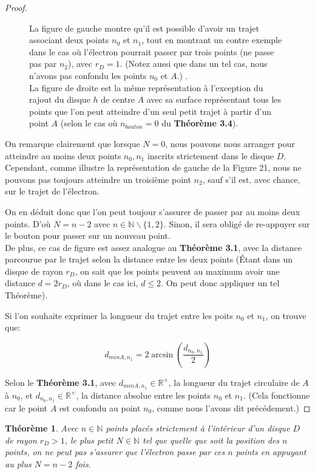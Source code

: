 \documentclass[a4paper]{amsart}
\newtheorem{theorem}{Théorème}[section]
\theoremstyle{definition}
\theoremstyle{remark}
\numberwithin{equation}{section}
\begin{document}
\begin{proof}
\begin{figure}[H]
    \caption{La figure de gauche montre qu'il est possible d'avoir un trajet associant deux points $n_0$ et $n_1$, tout en montrant un contre exemple dans le cas où l'électron pourrait passer par trois points (ne passe pas par $n_2$), avec $r_D=1$. (Notez aussi que dans un tel cas, nous n'avons pas confondu les points $n_0$ et $A$.)
    . \\La figure de droite est la même représentation à l'exception du rajout du disque $h$ de centre $A$ avec sa surface représentant tous les points que l'on peut atteindre d'un seul petit trajet à partir d'un point $A$ (selon le cas où $n_{bouton}=0$ du \textbf{Théorème 3.4}).}
  \end{figure}

  On remarque clairement que lorsque $N=0$, nous pouvons nous arranger pour atteindre au moins deux points $n_0,n_1$ inscrits strictement dans le disque $D$. Cependant, comme illustre la représentation de gauche de la Figure 21, nous ne pouvons pas 
  toujours atteindre un troisième point $n_2$, sauf s'il est, avec chance, sur le trajet de l'électron.

  On en déduit donc que l'on peut toujour s'assurer de passer par au moins deux points. D'où $N=n-2$ avec $n\in\mathbb{N}\backslash\lbrace{1,2}\rbrace$.
  Sinon, il sera obligé de re-appuyer sur le bouton pour passer sur un nouveau point. \\

  De plus, ce cas de figure est assez analogue au \textbf{Théorème 3.1}, avec la distance parcourue par le trajet selon la distance entre les deux points (Étant dans un disque de rayon $r_D$, on sait que les points peuvent au maximum avoir une distance $d=2r_D$, où dans le cas ici, $d\leq2$. On peut donc appliquer un tel Théorème).

  Si l'on souhaite exprimer la longueur du trajet entre les poits $n_0$ et $n_1$, on trouve que:

  \[d_{min A,n_1}=2\arcsin(\frac{d_{n_0,n_1}}{2})\]

  Selon le \textbf{Théorème 3.1}, avec $d_{min A,n_1}\in\mathbb{R^+}$, la longueur du trajet circulaire de $A$ à $n_0$, et $d_{n_0,n_1}\in\mathbb{R^+}$, la distance absolue entre les points $n_0$ et $n_1$. (Cela fonctionne car le point $A$ est confondu au point $n_0$, comme nous l'avons dit précédement.)
\end{proof}

\begin{theorem}
  Avec $n\in\mathbb{N}$ points placés strictement à l'intérieur d'un disque $D$ de rayon $r_D>1$, le plus petit $N\in\mathbb{N}$ tel que quelle que soit la
  position des $n$ points, on ne peut pas s’assurer que l’électron passe par ces $n$ points en appuyant au plus $N=n-2$ fois.
\end{theorem}
\end{document}
